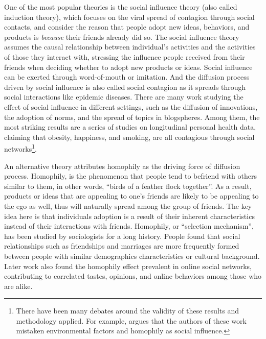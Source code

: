 \documentclass[phd,tocprelim]{cornell}
\begin{document}
One of the most popular theories is the social influence theory (also called induction theory), which focuses on the viral spread of contagion through social contacts, and consider the reason that people adopt new ideas, behaviors, and products is \emph{because} their friends already did so. The social influence theory assumes the causal relationship between individual's activities and the activities of those they interact with, stressing the influence people received from their friends when deciding whether to adopt new products or ideas. Social influence can be exerted through word-of-mouth or imitation. And the diffusion process driven by social influence is also called social contagion as it spreads through social interactions like epidemic diseases. There are many work studying the effect of social influence in different settings, such as the diffusion of innovations\cite{strang-1998}, the adoption of norms\cite{Axelrod-1986}, and the spread of topics in blogspheres\cite{Java-2006}. Among them, the most striking results are a series of studies on longitudinal personal health data, claiming that obesity\cite{Christakis-2007}, happiness\cite{Fowler-2008}, and smoking\cite{Christakis-2008}, are all contagious through social networks\footnote{There have been many debates around the validity of these results and methodology applied. For example, \cite{CohenCole-2008, Lyons-2010} argues that the authors of these work mistaken environmental factors and homophily as social influence.}. 

An alternative theory attributes homophily as the driving force of diffusion process. Homophily, is the phenomenon that people tend to befriend with others similar to them, in other words, ``birds of a feather flock together''. As a result, products or ideas that are appealing to one's friends are likely to be appealing to the ego as well, thus will naturally spread among the group of friends. The key idea here is that individuals adoption is a result of their inherent characteristics instead of their interactions with friends. Homophily, or ``selection mechanism'', has been studied by sociologists for a long history. People found that social relationships such as friendships and marriages are more frequently formed between people with similar demographics characteristics or cultural background\cite{lazarsfeld-1954,mcpherson-2001}. Later work also found the homophily effect prevalent in online social networks, contributing to correlated tastes, opinions, and online behaviors among those who are alike\cite{Liben-Nowell-2005,kossinets-2006,Kossinets-2009}.
\end{document}
